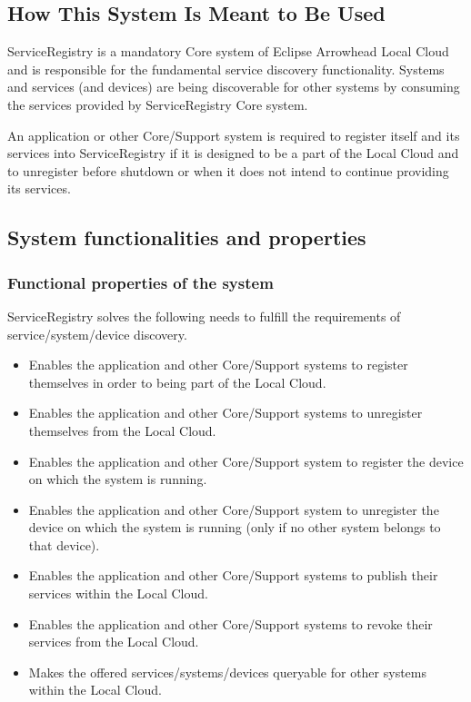 \documentclass[a4paper]{arrowhead}
\begin{document}
\subsection{How This System Is Meant to Be Used}
\label{sec:use}

ServiceRegistry is a mandatory Core system of Eclipse Arrowhead Local Cloud and is responsible for the fundamental service discovery functionality. Systems and services (and devices) are being discoverable for other systems by consuming the services provided by ServiceRegistry Core system.

An application or other Core/Support system is required to register itself and its services into ServiceRegistry if it is designed to be a part of the Local Cloud and to unregister before shutdown or when it does not intend to continue providing its services.

\subsection{System functionalities and properties}
\label{sec:properties}

\subsubsection {Functional properties of the system}
ServiceRegistry solves the following needs to fulfill the requirements of service/system/device discovery.

\begin{itemize}
    \item Enables the application and other Core/Support systems to register themselves in order to being part of the Local Cloud.
    \item Enables the application and other Core/Support systems to unregister themselves from the Local Cloud.
    \item Enables the application and other Core/Support system to register the device on which the system is running.
    \item Enables the application and other Core/Support system to unregister the device on which the system is running (only if no other system belongs to that device).
    \item Enables the application and other Core/Support systems to publish their services within the Local Cloud.
    \item Enables the application and other Core/Support systems to revoke their services from the Local Cloud.
    \item Makes the offered services/systems/devices queryable for other systems within the Local Cloud.
\end{itemize}
\end{document}

